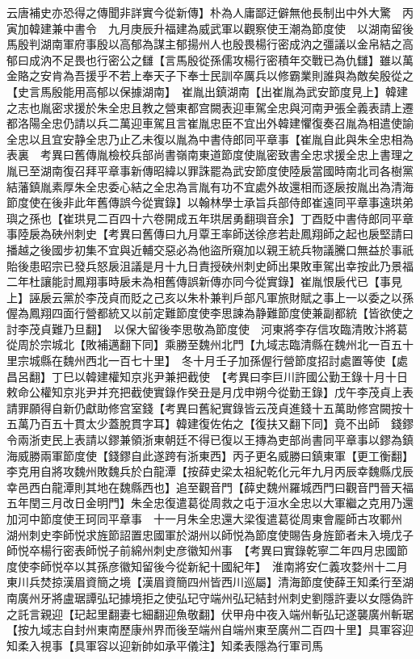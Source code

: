 云唐補史亦恐得之傳聞非詳實今從新傳】朴為人庸鄙迂僻無他長制出中外大驚　丙寅加韓建兼中書令　九月庚辰升福建為威武軍以觀察使王潮為節度使　以湖南留後馬殷判湖南軍府事殷以高郁為謀主郁揚州人也殷畏楊行密成汭之彊議以金帛結之高郁曰成汭不足畏也行密公之讎【言馬殷從孫儒攻楊行密積年交戰已為仇讎】雖以萬金賂之安肯為吾援乎不若上奉天子下奉士民訓卒厲兵以修霸業則誰與為敵矣殷從之【史言馬殷能用高郁以保據湖南】　崔胤出鎮湖南【出崔胤為武安節度見上】韓建之志也胤密求援於朱全忠且教之營東都宫闕表迎車駕全忠與河南尹張全義表請上遷都洛陽全忠仍請以兵二萬迎車駕且言崔胤忠臣不宜出外韓建懼復奏召胤為相遣使諭全忠以且宜安静全忠乃止乙未復以胤為中書侍郎同平章事【崔胤自此與朱全忠相為表裏　考異曰舊傳胤檢校兵部尚書嶺南東道節度使胤密致書全忠求援全忠上書理之胤已至湖南復召拜平章事新傳昭緯以罪誅罷為武安節度使陸扆當國時南北司各樹黨結藩鎮胤素厚朱全忠委心結之全忠為言胤有功不宜處外故還相而逐扆按胤出為清海節度使在後非此年舊傳誤今從實錄】以翰林學士承旨兵部侍郎崔遠同平章事遠珙弟璵之孫也【崔珙見二百四十六卷開成五年珙居勇翻璵音余】丁酉貶中書侍郎同平章事陸扆為硤州刺史【考異曰舊傳曰九月覃王率師送徐彦若赴鳳翔師之起也扆堅請曰播越之後國步初集不宜與近輔交惡必為他盜所窺加以親王統兵物議騰口無益於事祇貽後患昭宗已發兵怒扆沮議是月十九日責授硤州刺史師出果敗車駕出幸按此乃景福二年杜讓能討鳳翔事時扆未為相舊傳誤新傳亦同今從實錄】崔胤恨扆代已【事見上】誣扆云黨於李茂貞而貶之己亥以朱朴兼判戶部凡軍旅財賦之事上一以委之以孫偓為鳳翔四面行營都統又以前定難節度使李思諫為静難節度使兼副都統【皆欲使之討李茂貞難乃旦翻】　以保大留後李思敬為節度使　河東將李存信攻臨清敗汴將葛從周於宗城北【敗補邁翻下同】乘勝至魏州北門【九域志臨清縣在魏州北一百五十里宗城縣在魏州西北一百七十里】　冬十月壬子加孫偓行營節度招討處置等使【處昌呂翻】丁巳以韓建權知京兆尹兼把截使　【考異曰李巨川許國公勤王錄十月十日敕命公權知京兆尹并充把截使實錄作癸丑是月戊申朔今從勤王錄】戊午李茂貞上表請罪願得自新仍獻助修宫室錢【考異曰舊紀實錄皆云茂貞進錢十五萬助修宫闕按十五萬乃百五十貫太少蓋脫貫字耳】韓建復佐佑之【復扶又翻下同】竟不出師　錢鏐令兩浙吏民上表請以鏐兼領浙東朝廷不得已復以王摶為吏部尚書同平章事以鏐為鎮海威勝兩軍節度使【錢鏐自此遂跨有浙東西】丙子更名威勝曰鎮東軍【更工衡翻】　李克用自將攻魏州敗魏兵於白龍潭【按薛史梁太祖紀乾化元年九月丙辰幸魏縣戊辰幸邑西白龍潭則其地在魏縣西也】追至觀音門【薛史魏州羅城西門曰觀音門晉天福五年閏三月改日金明門】朱全忠復遣葛從周救之屯于洹水全忠以大軍繼之克用乃還　加河中節度使王珂同平章事　十一月朱全忠還大梁復遣葛從周東會龎師古攻鄆州　湖州刺史李師悦求旌節詔置忠國軍於湖州以師悦為節度使賜告身旌節者未入境戊子師悦卒楊行密表師悦子前綿州刺史彦徽知州事　【考異曰實錄乾寧二年四月忠國節度使李師悦卒以其孫彦徽知留後今從新紀十國紀年】　淮南將安仁義攻婺州十二月東川兵焚掠漢眉資簡之境【漢眉資簡四州皆西川巡屬】清海節度使薛王知柔行至湖南廣州牙將盧琚譚弘玘據境拒之使弘玘守端州弘玘結封州刺史劉隱許妻以女隱偽許之託言親迎【玘起里翻妻七細翻迎魚敬翻】伏甲舟中夜入端州斬弘玘遂襲廣州斬琚【按九域志自封州東南歷康州界而後至端州自端州東至廣州二百四十里】具軍容迎知柔入視事【具軍容以迎新帥如承平儀注】知柔表隱為行軍司馬

